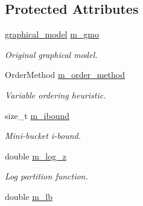 \subsection*{Protected Attributes}
\begin{DoxyCompactItemize}
\item 
\hyperlink{classmerlin_1_1graphical__model}{graphical\+\_\+model} \hyperlink{classmerlin_1_1jglp_ac0f668e6d434179145bfb10afce53938}{m\+\_\+gmo}\hypertarget{classmerlin_1_1jglp_ac0f668e6d434179145bfb10afce53938}{}\label{classmerlin_1_1jglp_ac0f668e6d434179145bfb10afce53938}

\begin{DoxyCompactList}\small\item\em Original graphical model. \end{DoxyCompactList}\item 
Order\+Method \hyperlink{classmerlin_1_1jglp_a406bdf7a6e931ff40a7c0a0ddcf8d099}{m\+\_\+order\+\_\+method}\hypertarget{classmerlin_1_1jglp_a406bdf7a6e931ff40a7c0a0ddcf8d099}{}\label{classmerlin_1_1jglp_a406bdf7a6e931ff40a7c0a0ddcf8d099}

\begin{DoxyCompactList}\small\item\em Variable ordering heuristic. \end{DoxyCompactList}\item 
size\+\_\+t \hyperlink{classmerlin_1_1jglp_a06d2c5e9d89c5af6e21ded02eaf3222b}{m\+\_\+ibound}\hypertarget{classmerlin_1_1jglp_a06d2c5e9d89c5af6e21ded02eaf3222b}{}\label{classmerlin_1_1jglp_a06d2c5e9d89c5af6e21ded02eaf3222b}

\begin{DoxyCompactList}\small\item\em Mini-\/bucket i-\/bound. \end{DoxyCompactList}\item 
double \hyperlink{classmerlin_1_1jglp_afb663294d5593789c47985869b36bd48}{m\+\_\+log\+\_\+z}\hypertarget{classmerlin_1_1jglp_afb663294d5593789c47985869b36bd48}{}\label{classmerlin_1_1jglp_afb663294d5593789c47985869b36bd48}

\begin{DoxyCompactList}\small\item\em Log partition function. \end{DoxyCompactList}\item 
double \hyperlink{classmerlin_1_1jglp_aa64d901abe0f4d02f144460323a386b4}{m\+\_\+lb}\hypertarget{classmerlin_1_1jglp_aa64d901abe0f4d02f144460323a386b4}{}\label{classmerlin_1_1jglp_aa64d901abe0f4d02f144460323a386b4}


\end{DoxyCompactItemize}
